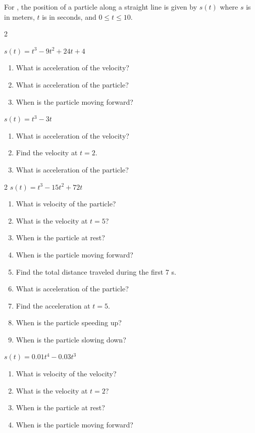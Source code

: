 \documentclass{book}
\begin{document}
For , the position of a particle along a straight line is given by $s(t)$ where $s$ is in meters, $t$ is in seconds, and $0\le t\le 10$. 
\begin{enumerate}[!HW!]
\begin{multicols}{2}
\item\label{exer:derivativemotion:start} $s(t) = t^3-9t^2+24t+4$
\begin{enumerate}
\item What is acceleration of the velocity? 
\item What is acceleration of the particle? 
\item When is the particle moving forward?
\end{enumerate}
\item  $s(t) = t^3-3t$
\begin{enumerate}
\item What is acceleration of the velocity? 
\item Find the velocity at $t= 2$.
\item What is acceleration of the particle? 
\end{enumerate}
\end{multicols}
\begin{multicols}{2}
\itemspade $s(t)=t^3-15t^2+72t$ 
\begin{enumerate}
\item What is velocity of the particle? 
\item What is the velocity at $t=5$? 
\item When is the particle at rest? 
\item When is the particle moving forward?
\item Find the total distance traveled during the first 7 s.
\item What is acceleration of the particle? 
\item Find the acceleration at $t=5$.
\item When is the particle speeding up?
\item When is the particle slowing down?
\end{enumerate}
\itemspade $s(t)=0.01t^4-0.03t^3$ 
\begin{enumerate}
\item What is velocity of the velocity? 
\item What is the velocity at $t=2$? 
\item When is the particle at rest? 
\item When is the particle moving forward?

\end{enumerate}
\end{multicols}
\end{enumerate}
\end{document}
